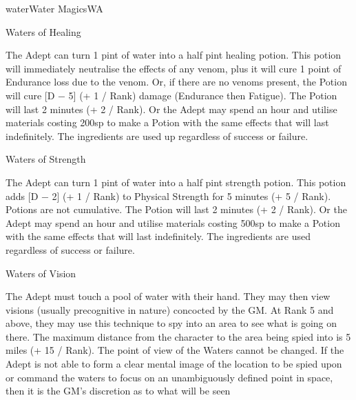 \begin{College}[1.3]{water}{Water Magics}{WA}
\begin{spell}[S-11]{Waters of Healing}

\begin{effects}
The Adept can turn 1 pint of water into a half pint healing potion.
This potion will immediately neutralise the effects of any venom, plus
it will cure 1 point of Endurance loss due to the venom.  Or, if there
are no venoms present, the Potion will cure [D − 5] (+ 1 / Rank)
damage (Endurance then Fatigue).  The Potion will last 2 minutes (+ 2
/ Rank). Or the Adept may spend an hour and utilise materials costing
200sp to make a Potion with the same effects that will last
indefinitely.  The ingredients are used up regardless of success or
failure.
\end{effects}
\end{spell}

\begin{spell}[S-12]{Waters of Strength}

\begin{effects}
The Adept can turn 1 pint of water into a half pint strength potion.
This potion adds [D − 2] (+ 1 / Rank) to Physical Strength for 5
minutes (+ 5 / Rank).  Potions are not cumulative.  The Potion will
last 2 minutes (+ 2 / Rank). Or the Adept may spend an hour and
utilise materials costing 500sp to make a Potion with the same effects
that will last indefinitely. The ingredients are used regardless of
success or failure.
\end{effects}
\end{spell}

\begin{spell}[S-13]{Waters of Vision}

\begin{effects}
The Adept must touch a pool of water with their hand.  They may then
view visions (usually precognitive in nature) concocted by the GM.  At
Rank 5 and above, they may use this technique to spy into an area to
see what is going on there. The maximum distance from the character to
the area being spied into is 5 miles (+ 15 / Rank). The point of view
of the Waters cannot be changed.  If the Adept is not able to form a
clear mental image of the location to be spied upon or command the
waters to focus on an unambiguously defined point in space, then it is
the GM’s discretion as to what will be seen
\end{effects}
\end{spell}


\end{College}
